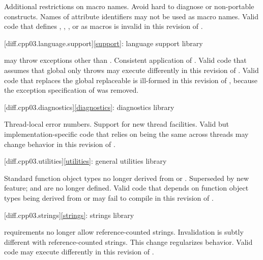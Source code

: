 \change
Additional restrictions on macro names.
\rationale
Avoid hard to diagnose or non-portable constructs.
\effect
Names of attribute identifiers may not be used as macro names. Valid \CppIII{}
code that defines , ,
, or  as macros is invalid in this
revision of \Cpp{}.

[diff.cpp03.language.support]{\ref{support}:
language support library}

\change
{} may throw exceptions other than
.
\rationale
Consistent application of .
\effect
Valid \CppIII{} code that assumes that global  only
throws  may execute differently in this revision of \Cpp{}.
Valid \CppIII{} code that replaces the global replaceable 
is ill-formed in this revision of \Cpp{},
because the exception specification of 
was removed.

[diff.cpp03.diagnostics]{\ref{diagnostics}: diagnostics library}

\change
Thread-local error numbers.
\rationale
Support for new thread facilities.
\effect
Valid but implementation-specific \CppIII{} code that relies on
 being the same across threads may change behavior in this
revision of \Cpp{}.

[diff.cpp03.utilities]{\ref{utilities}: general utilities library}

\change
Standard function object types no longer derived from
 or .
\rationale
Superseded by new feature;  and
 are no longer defined.
\effect
Valid \CppIII{} code that depends on function object types being derived from
 or  may fail to compile
in this revision of \Cpp{}.

[diff.cpp03.strings]{\ref{strings}: strings library}

\change
{} requirements no longer allow reference-counted
strings.
\rationale
Invalidation is subtly different with reference-counted strings.
This change regularizes behavior.
\effect
Valid \CppIII{} code may execute differently in this revision of \Cpp{}.


